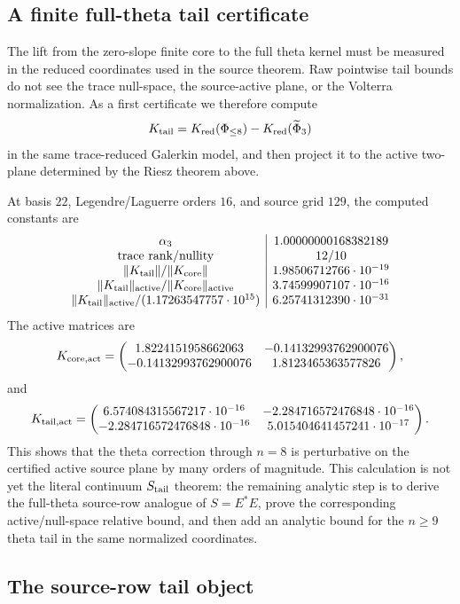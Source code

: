 \documentclass[11pt]{article}
\begin{document}
\subsection{A finite full-theta tail certificate}

The lift from the zero-slope finite core to the full theta kernel must be
measured in the reduced coordinates used in the source theorem.  Raw pointwise
tail bounds do not see the trace null-space, the source-active plane, or the
Volterra normalization.  As a first certificate we therefore compute
\[
  K_{\rm tail}
  =
  K_{\rm red}(\Phi_{\le 8})-K_{\rm red}(\widetilde\Phi_3)
\]
in the same trace-reduced Galerkin model, and then project it to the active
two-plane determined by the Riesz theorem above.

At basis \(22\), Legendre/Laguerre orders \(16\), and source grid \(129\), the
computed constants are
\[
\begin{array}{c|c}
\alpha_3&1.00000000168382189\\
{\rm trace\ rank/nullity}&12/10\\
\|K_{\rm tail}\|/\|K_{\rm core}\|&1.98506712766\cdot10^{-19}\\
\|K_{\rm tail}\|_{\rm active}/\|K_{\rm core}\|_{\rm active}
  &3.74599907107\cdot10^{-16}\\
\|K_{\rm tail}\|_{\rm active}/(1.17263547757\cdot10^{15})
  &6.25741312390\cdot10^{-31}
\end{array}
\]
The active matrices are
\[
K_{\rm core,act}=
\begin{pmatrix}
1.8224151958662063&-0.14132993762900076\\
-0.14132993762900076&1.8123465363577826
\end{pmatrix},
\]
and
\[
K_{\rm tail,act}=
\begin{pmatrix}
6.574084315567217\cdot10^{-16}&-2.284716572476848\cdot10^{-16}\\
-2.284716572476848\cdot10^{-16}&5.015404641457241\cdot10^{-17}
\end{pmatrix}.
\]
This shows that the theta correction through \(n=8\) is perturbative on the
certified active source plane by many orders of magnitude.  This calculation is
not yet the literal continuum \(S_{\rm tail}\) theorem: the remaining analytic
step is to derive the full-theta source-row analogue of \(S=E^\ast E\), prove
the corresponding active/null-space relative bound, and then add an analytic
bound for the \(n\ge9\) theta tail in the same normalized coordinates.

\subsection{The source-row tail object}
\end{document}
